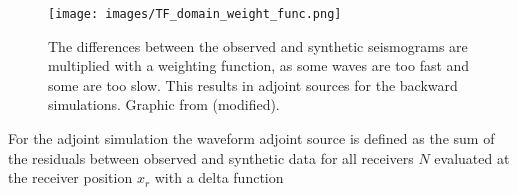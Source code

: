 \begin{figure}[h]
\begin{center}
\texttt{[image: images/TF\_domain\_weight\_func.png]}
\caption[Misfit function and weighting. Graphic from \citealp{Fichtner2011}.]{The differences between the 
observed and synthetic seismograms are multiplied with a weighting function,
as some waves are too fast and some are too slow.
This results in adjoint sources for the backward simulations.
Graphic from \citealp{Fichtner2011}(modified).}
\label{weight_func}
\end{center}
\end{figure}



%
%







For the adjoint simulation the waveform adjoint source is defined as the sum of the residuals between observed and 
synthetic data for all receivers $N$ evaluated at the receiver position $x_r$ with a delta function 

